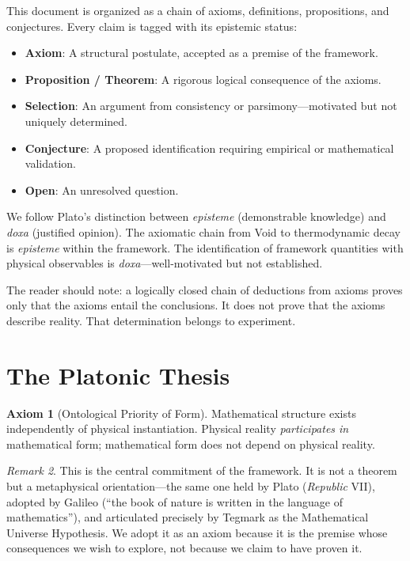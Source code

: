 \documentclass[11pt,twoside]{article}
\theoremstyle{definition}
\newtheorem{axiom}{Axiom}
\theoremstyle{plain}
\theoremstyle{remark}
\newtheorem{remark}[axiom]{Remark}
\begin{document}
This document is organized as a chain of axioms, definitions, propositions, and conjectures. Every claim is tagged with its epistemic status:

\begin{itemize}[nosep]
    \item \textbf{Axiom}: A structural postulate, accepted as a premise of the framework.
    \item \textbf{Proposition / Theorem}: A rigorous logical consequence of the axioms.
    \item \textbf{Selection}: An argument from consistency or parsimony---motivated but not uniquely determined.
    \item \textbf{Conjecture}: A proposed identification requiring empirical or mathematical validation.
    \item \textbf{Open}: An unresolved question.
\end{itemize}

We follow Plato's distinction between \emph{episteme} (demonstrable knowledge) and \emph{doxa} (justified opinion). The axiomatic chain from Void to thermodynamic decay is \emph{episteme} within the framework. The identification of framework quantities with physical observables is \emph{doxa}---well-motivated but not established.

The reader should note: a logically closed chain of deductions from axioms proves only that the axioms entail the conclusions. It does not prove that the axioms describe reality. That determination belongs to experiment.

\section{The Platonic Thesis}

\begin{axiom}[Ontological Priority of Form]\label{ax:platonism}
Mathematical structure exists independently of physical instantiation. Physical reality \emph{participates in} mathematical form; mathematical form does not depend on physical reality.
\end{axiom}

\begin{remark}
This is the central commitment of the framework. It is not a theorem but a metaphysical orientation---the same one held by Plato (\emph{Republic} VII), adopted by Galileo (``the book of nature is written in the language of mathematics''), and articulated precisely by Tegmark as the Mathematical Universe Hypothesis. We adopt it as an axiom because it is the premise whose consequences we wish to explore, not because we claim to have proven it.
\end{remark}
\end{document}
